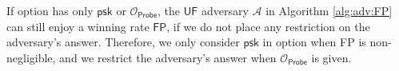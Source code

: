 
If \textsf{option} has only $\textsf{psk}$ or $\mathcal{O}_\textsf{Probe}$, the $\textsf{UF}$ adversary $\mathcal{A}$ in Algorithm \ref{alg:adv:FP} can still enjoy a winning rate $\textsf{FP}$, if we do not place any restriction on the adversary's answer. Therefore, we only consider $\textsf{psk}$ in \textsf{option} when \textsf{FP} is non-negligible, and we restrict the adversary's answer when $\mathcal{O}_\textsf{Probe}$ is given.
 

		
		


